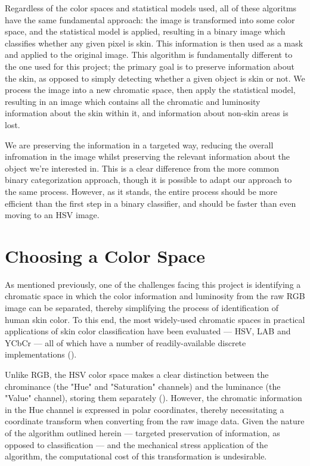 Regardless of the color spaces and statistical models used, all of these algoritms have the same fundamental approach: the image is transformed into some color space, and the statistical model is applied, resulting in a binary image which classifies whether any given pixel is skin. This information is then used as a mask and applied to the original image. This algorithm is fundamentally different to the one used for this project; the primary goal is to preserve information about the skin, as opposed to simply detecting whether a given object is skin or not. We process the image into a new chromatic space, then apply the statistical model, resulting in an image which contains all the chromatic and luminosity information about the skin within it, and information about non-skin areas is lost. 

We are preserving the information in a targeted way, reducing the overall infromation in the image whilst preserving the relevant information about the object we're interested in. This is a clear difference from the more common binary categorization approach, though it is possible to adapt our approach to the same process. However, as it stands, the entire process should be more efficient than the first step in a binary classifier, and should be faster than even moving to an HSV image.


\section{Choosing a Color Space}

As mentioned previously, one of the challenges facing this project is identifying a chromatic space in which the color information and luminosity from the raw RGB image can be separated, thereby simplifying the process of identification of human skin color. To this end, the most widely-used chromatic spaces in practical applications of skin color classification have been evaluated --- HSV, LAB and YCbCr --- all of which have a number of readily-available discrete implementations (\cite{Vezhnevets2003,Zarit1999a,Yang1997a,Brand2000a,Sigal2000a,Chai2000a,Phung2002a}).

Unlike RGB, the HSV color space makes a clear distinction between the chrominance (the "Hue" and "Saturation" channels) and the luminance (the "Value" channel), storing them separately (\cite{Vezhnevets2003,Sigal2000a}). However, the chromatic information in the Hue channel is expressed in polar coordinates, thereby necessitating a coordinate transform when converting from the raw image data. Given the nature of the algorithm outlined herein --- targeted preservation of information, as opposed to classification --- and the mechanical stress application of the algorithm, the computational cost of this transformation is undesirable.

